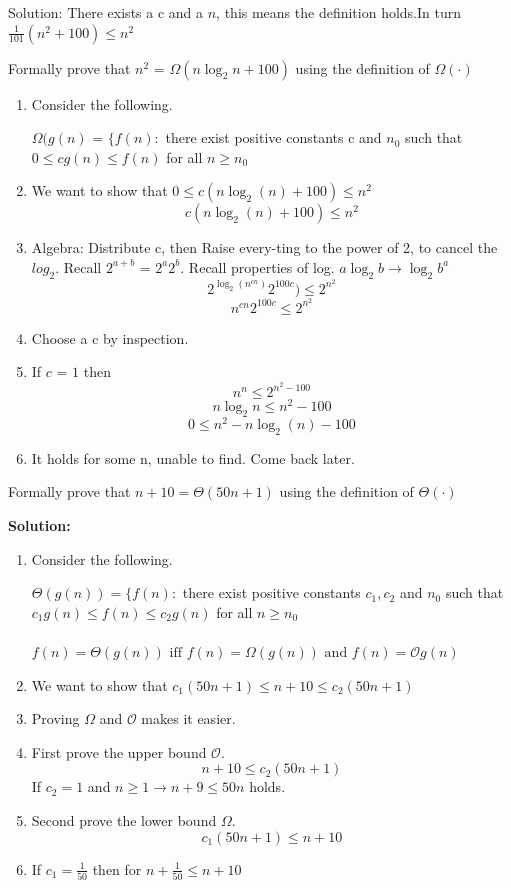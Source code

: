 \documentclass[11pt,fleqn]{book}
\begin{document}
\color{blue} Solution: There exists a c and a $n$, this means the definition holds.In turn  $\frac{1}{101}(n^2 + 100) \leq n^2$
\color{black}
\begin{example}
 Formally prove that $n^2 \text{ = }\Omega(n\log_2n + 100)$ using the definition of $\Omega(\cdot)$
\end{example}
\begin{enumerate}
    \item Consider the following. \\
    \begin{definition}
    $\Omega(g(n) \text{ = } \{f(n) : $ there exist positive constants c and $n_0$ such that $0 \leq cg(n) \leq f(n)$ for all $n \geq n_0$
    \end{definition}
    \item We want to show that $0 \leq c(n\log_2(n) + 100) \leq n^2$
    $$c(n\log_2(n) + 100) \leq n^2$$
    \item Algebra: Distribute c, then Raise every-ting to the power of 2, to cancel the $log_2$. Recall $2^{a + b} \text{ = } 2^a2^b$. Recall properties of log. $a\log_2{b} \rightarrow \log_2{b^a}$
    $$2^{\log_2(n^{cn})}2^{100c}) \leq 2^{n^2}$$
    $$n^{cn}2^{100c} \leq 2^{n^2}$$
    \item Choose a c by inspection. 
    \item If $c \text{ = } 1$ then 
    $$n^{n} \leq 2^{n^2 - 100}$$
    $$n\log_2{n} \leq n^2 - 100$$
    $$0 \leq n^2 - n\log_2(n) - 100$$
   \item It holds for some n, unable to find. Come back later. 
\end{enumerate}
\begin{example}
 Formally prove that $n + 10 = \Theta(50n + 1)$ using the definition of $\Theta(\cdot)$
\end{example}
\textbf{Solution: } 
\begin{enumerate}
    \item Consider the following. 
    \begin{definition}
    $\Theta(g(n)) = \{ f(n) : $ there exist positive constants $c_1, c_2$ and $n_0$ such that\\ $c_1g(n) \leq f(n) \leq c_2g(n)$ for all $n \geq n_0$ \\\\
    $f(n) = \Theta(g(n)) \text{ iff } f(n) = \Omega(g(n)) \text{ and } f(n) = \mathcal{O} g(n)$
    \end{definition}
    \item We want to show that $c_1(50n + 1) \leq n + 10 \leq c_2(50n + 1)$
    \item Proving $\Omega$ and $\mathcal{O}$ makes it easier.
    \item First prove the upper bound $\mathcal{O}$. 
    $$n + 10 \leq c_2(50n + 1)$$
    If $c_2 = 1$ and $n \geq 1 \rightarrow n + 9 \leq 50n$ holds. 
    
    \item Second prove the lower bound $\Omega$. 
    $$c_1(50n + 1) \leq n + 10$$
    \item  If $c_1 = \frac{1}{50}$ then for $n + \frac{1}{50} \leq n + 10 $
\end{enumerate}
\end{document}
